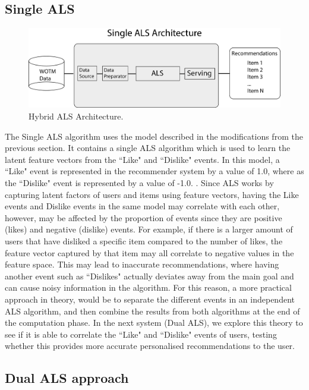 \subsection{Single ALS}

\begin{figure}
\centering
\includegraphics[scale=0.4]{recent_images/Single_ALS_architecture.png}
\caption{Hybrid ALS Architecture.}
\label{fig:single_architecture}
\end{figure}

The Single ALS algorithm uses the model described in the modifications from the previous section. It contains a single ALS algorithm which is used to learn the latent feature vectors from the ``Like" and ``Dislike" events. In this model, a ``Like" event is represented in the recommender system by a value of 1.0, where as the ``Dislike" event is represented by a value of -1.0. . Since ALS works by capturing latent factors of users and items using feature vectors, having the Like events and Dislike events in the same model may correlate with each other, however, may be affected by the proportion of events since they are positive (likes) and negative (dislike) events. For example, if there is a larger amount of users that have disliked a specific item compared to the number of likes, the feature vector captured by that item may all correlate to negative values in the feature space. This may lead to inaccurate recommendations, where having another event such as ``Dislikes" actually deviates away from the main goal and can cause noisy information in the algorithm. For this reason, a more practical approach in theory, would be to separate the different events in an independent ALS algorithm, and then combine the results from both algorithms at the end of the computation phase. In the next system (Dual ALS), we explore this theory to see if it is able to correlate the ``Like" and ``Dislike" events of users, testing whether this provides more accurate personalised recommendations to the user. 

\subsection{Dual ALS approach} 


